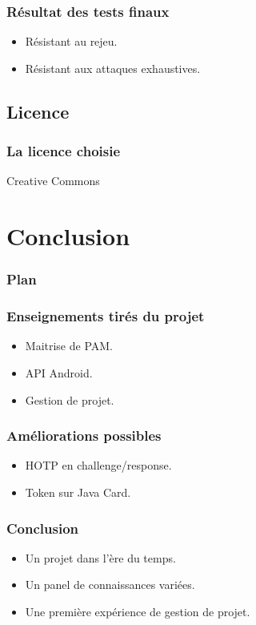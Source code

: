\documentclass[xcolor=table]{beamer}
\begin{document}
\begin{frame}
\frametitle{Résultat des tests finaux}
\begin{itemize}
\item Résistant au rejeu.
\item Résistant aux attaques exhaustives.
\end{itemize}

\end{frame}

\subsection{Licence}
\begin{frame}
\frametitle{La licence choisie}
\begin{center}
\Huge Creative Commons
\end{center}

\end{frame}


\section{Conclusion}

\begin{frame}  
\frametitle{Plan} 
\end{frame}

\begin{frame}
\frametitle{Enseignements tirés du projet}
\begin{itemize}
\item Maitrise de PAM.
\item API Android.
\item Gestion de projet.
\end{itemize}
\end{frame}


\begin{frame}
\frametitle{Améliorations possibles}
\begin{itemize}
\item HOTP en challenge/response.
\item Token sur Java Card.
\end{itemize}
\end{frame}

\begin{frame}
\frametitle{Conclusion}
\begin{itemize}
\item Un projet dans l'ère du temps.
\item Un panel de connaissances variées.
\item Une première expérience de gestion de projet.
\end{itemize}
\end{frame}
\end{document}
